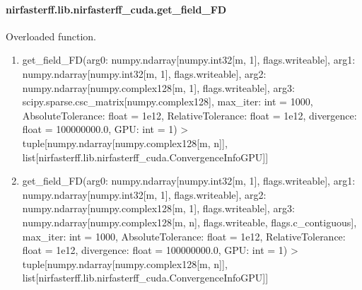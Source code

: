 \documentclass[letterpaper,10pt,english]{sphinxmanual}
\begin{document}
\sphinxstepscope


\paragraph{nirfasterff.lib.nirfasterff\_cuda.get\_field\_FD}
\label{\detokenize{_autosummary/nirfasterff.lib.nirfasterff_cuda.get_field_FD:nirfasterff-lib-nirfasterff-cuda-get-field-fd}}\label{\detokenize{_autosummary/nirfasterff.lib.nirfasterff_cuda.get_field_FD::doc}}

\begin{fulllineitems}
\label{\detokenize{_autosummary/nirfasterff.lib.nirfasterff_cuda.get_field_FD:nirfasterff.lib.nirfasterff_cuda.get_field_FD}}
\pysigstartsignatures
\pysiglinewithargsret
{}
{\sphinxparamcomma {}}
{}
\pysigstopsignatures
\sphinxAtStartPar
Overloaded function.
\begin{enumerate}
%
\item {} 
\sphinxAtStartPar
get\_field\_FD(arg0: numpy.ndarray{[}numpy.int32{[}m, 1{]}, flags.writeable{]}, arg1: numpy.ndarray{[}numpy.int32{[}m, 1{]}, flags.writeable{]}, arg2: numpy.ndarray{[}numpy.complex128{[}m, 1{]}, flags.writeable{]}, arg3: scipy.sparse.csc\_matrix{[}numpy.complex128{]}, max\_iter: int = 1000, AbsoluteTolerance: float = 1e\sphinxhyphen{}12, RelativeTolerance: float = 1e\sphinxhyphen{}12, divergence: float = 100000000.0, GPU: int = \sphinxhyphen{}1) \sphinxhyphen{}\textgreater{} tuple{[}numpy.ndarray{[}numpy.complex128{[}m, n{]}{]}, list{[}nirfasterff.lib.nirfasterff\_cuda.ConvergenceInfoGPU{]}{]}

\item {} 
\sphinxAtStartPar
get\_field\_FD(arg0: numpy.ndarray{[}numpy.int32{[}m, 1{]}, flags.writeable{]}, arg1: numpy.ndarray{[}numpy.int32{[}m, 1{]}, flags.writeable{]}, arg2: numpy.ndarray{[}numpy.complex128{[}m, 1{]}, flags.writeable{]}, arg3: numpy.ndarray{[}numpy.complex128{[}m, n{]}, flags.writeable, flags.c\_contiguous{]}, max\_iter: int = 1000, AbsoluteTolerance: float = 1e\sphinxhyphen{}12, RelativeTolerance: float = 1e\sphinxhyphen{}12, divergence: float = 100000000.0, GPU: int = \sphinxhyphen{}1) \sphinxhyphen{}\textgreater{} tuple{[}numpy.ndarray{[}numpy.complex128{[}m, n{]}{]}, list{[}nirfasterff.lib.nirfasterff\_cuda.ConvergenceInfoGPU{]}{]}

\end{enumerate}

\end{fulllineitems}
\end{document}
